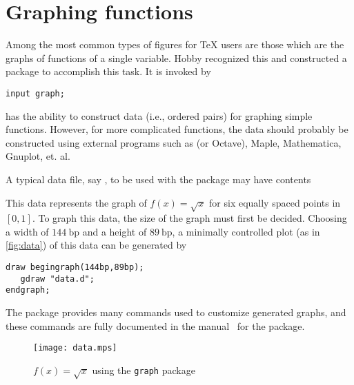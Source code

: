 \section{Graphing functions}
\label{sec:graphing}

Among the most common types of figures for \TeX{} users are those which
are the graphs of functions of a single variable.  Hobby recognized this
and constructed a package to accomplish this task.  It is invoked by

\begin{lstlisting}[style=MP]
input graph;
\end{lstlisting}

\MP{} has the ability to construct data (i.e., ordered pairs) for
graphing simple functions.  However, for more complicated functions, the
data should probably be constructed using external programs such as
 (or Octave), Maple, Mathematica, Gnuplot, et. al.

A typical data file, say , to be used with
the  package may have contents



This data represents the graph of $f(x)=\sqrt{x}$ for six equally spaced
points in $[0,1]$.  To graph this data, the size of the graph must first
be decided.  Choosing a width of $144\mathrm{\ bp}$ and a height of
$89\mathrm{\ bp}$, a minimally controlled plot (as in
\autoref{fig:data}) of this data can be generated by

\begin{lstlisting}[style=MP]
draw begingraph(144bp,89bp);
   gdraw "data.d";
endgraph;
\end{lstlisting}

The  package provides many commands used to customize
generated graphs, and these commands are fully documented in the
manual~\cite{hobby:graph} for the  package.

\begin{figure}
  \centering
  \texttt{[image: data.mps]}
  \caption{$f(x)=\sqrt{x}$ using the \texttt{graph} package}
  \label{fig:data}
\end{figure}
